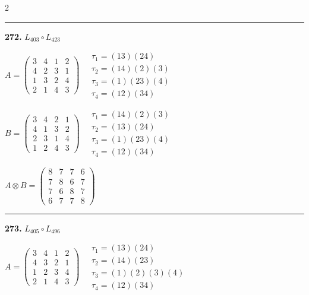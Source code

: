 \begin{multicols}{2}
\vspace{0.3em}
\hrule
\vspace{0.3em}

\noindent\textbf{272.} $L_{403} \circ L_{423}$

$A = \begin{pmatrix} 3 & 4 & 1 & 2 \\ 4 & 2 & 3 & 1 \\ 1 & 3 & 2 & 4 \\ 2 & 1 & 4 & 3 \end{pmatrix} \quad \begin{matrix} \tau_{1}=(1 3)(2 4) \\ \tau_{2}=(1 4)(2)(3) \\ \tau_{3}=(1)(2 3)(4) \\ \tau_{4}=(1 2)(3 4) \end{matrix}$

$B = \begin{pmatrix} 3 & 4 & 2 & 1 \\ 4 & 1 & 3 & 2 \\ 2 & 3 & 1 & 4 \\ 1 & 2 & 4 & 3 \end{pmatrix} \quad \begin{matrix} \tau_{1}=(1 4)(2)(3) \\ \tau_{2}=(1 3)(2 4) \\ \tau_{3}=(1)(2 3)(4) \\ \tau_{4}=(1 2)(3 4) \end{matrix}$

$A \otimes B = \begin{pmatrix} 8 & 7 & 7 & 6 \\ 7 & 8 & 6 & 7 \\ 7 & 6 & 8 & 7 \\ 6 & 7 & 7 & 8 \end{pmatrix}$

\vspace{0.3em}
\hrule
\vspace{0.3em}

\noindent\textbf{273.} $L_{405} \circ L_{496}$

$A = \begin{pmatrix} 3 & 4 & 1 & 2 \\ 4 & 3 & 2 & 1 \\ 1 & 2 & 3 & 4 \\ 2 & 1 & 4 & 3 \end{pmatrix} \quad \begin{matrix} \tau_{1}=(1 3)(2 4) \\ \tau_{2}=(1 4)(2 3) \\ \tau_{3}=(1)(2)(3)(4) \\ \tau_{4}=(1 2)(3 4) \end{matrix}$


\end{multicols}
